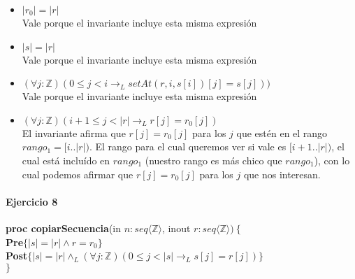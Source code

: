\documentclass{article}
\begin{document}
\begin{enumerate}[label=\alph*)]
\begin{itemize}
	\item $|r_0|=|r|$\\
	Vale porque el invariante incluye esta misma expresión
	\item $|s|=|r|$\\
	Vale porque el invariante incluye esta misma expresión
	\item $(\forall j:\mathbb{Z})(0\leq j<i \rightarrow_L setAt(r,i,s[i])[j]=s[j]))$\\
	Vale porque el invariante incluye esta misma expresión
	\item $(\forall j:\mathbb{Z})(i+1\leq j<|r|\rightarrow_L r[j]=r_0[j])$\\
	El invariante afirma que $r[j]=r_0[j]$ para los $j$ que estén en el rango $rango_1=[i..|r|)$. El rango para el cual queremos 
	ver si vale es $[i+1..|r|)$, el cual está incluído en $rango_1$ (nuestro rango es más chico que $rango_1$), con lo cual podemos
	afirmar que $r[j]=r_0[j]$ para los $j $ que nos interesan.
	\end{itemize}
\end{enumerate}

\paragraph{Ejercicio 8\\}
\noindent
\textbf{proc copiarSecuencia}(in $n: seq\langle\mathbb{Z}\rangle$, inout $r: seq\langle\mathbb{Z}\rangle)\ \{$\smallskip \\
\hspace*{6mm}\textbf{Pre}$\{|s|=|r|\wedge r=r_0\}$\\
\hspace*{6mm}\textbf{Post}$\{ |s|=|r|\wedge_L (\forall j:\mathbb{Z})(0\leq j<|s|\rightarrow_L s[j]=r[j])\}$\\
$\}$\medskip\\
\end{document}
